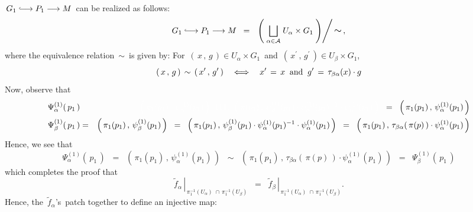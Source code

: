 \,$G_{1} \longhookrightarrow P_{1} \longrightarrow M$\,
can be realized as follows:
\begin{equation*}
G_{1} \longhookrightarrow P_{1} \longrightarrow M
\;\; = \;\;
	\left.\left(\;\underset{\alpha\in\mathcal{A}}{\bigsqcup}\;U_{\alpha} \times G_{1}\;\right)\right\slash\textnormal{\large$\sim$}\,,
\end{equation*}
where the equivalence relation \,$\sim$\, is given by:
For
\,$\left(\,x\,,\,g\,\right) \in U_{\alpha} \times G_{1}$\,
and
\,$\left(\,x^{\prime}\,,\,g^{\prime}\,\right) \in U_{\beta} \times G_{1}$,\,
\begin{equation*}
\left(\,x\,,\,g\,\right) \,\sim\, \left(\,x^{\prime}\,,\,g^{\prime}\,\right)
\quad\Longleftrightarrow\quad
x^{\prime} \,=\, x
\;\;\textnormal{and}\;\;
g^{\prime} \,=\, \tau_{\beta\alpha}(x) \cdot g
\end{equation*}
Now, observe that
\begin{eqnarray*}
\Psi^{(1)}_{\alpha}(\,p_{1}\,)
& {\color{white}=} &
	{\color{white}\left(\,\pi_{1}(p_{1}) \,,\, \psi^{(1)}_{\alpha}(p_{1})\,\right)}
\;\; {\color{white}111.} \;\;
	{\color{white}\left(\,\pi(p_{1}) \,,\, \psi^{(1)}_{\beta}(p_{1}) \cdot \psi^{(1)}_{\alpha}(p_{1})^{-1} \cdot \psi^{(1)}_{\alpha}(p_{1})\,\right)}
\;\; = \;\;
	\left(\,\pi_{1}(p_{1}) \,,\, \psi^{(1)}_{\alpha}(p_{1})\,\right)
\\
\Psi^{(1)}_{\beta}(\,p_{1}\,)
& = &
	\left(\,\pi_{1}(p_{1}) \,,\, \psi^{(1)}_{\beta}(p_{1})\,\right)
\;\; = \;\;
	\left(\,\pi_{1}(p_{1}) \,,\, \psi^{(1)}_{\beta}(p_{1}) \cdot \psi^{(1)}_{\alpha}(p_{1})^{-1} \cdot \psi^{(1)}_{\alpha}(p_{1})\,\right)
\;\; = \;\;
	\left(\,\pi_{1}(p_{1}) \,,\, \tau_{\beta\alpha}(\,\pi(p)\,) \cdot \psi^{(1)}_{\alpha}(p_{1})\,\right)
\end{eqnarray*}
Hence, we see that
\begin{equation*}
\Psi^{(1)}_{\alpha}(\,p_{1}\,)
\;\; = \;\;
	\left(\,\pi_{1}(p_{1}) \,,\, \psi^{(1)}_{\alpha}(p_{1})\,\right)
\;\; \sim \;\;
	\left(\,\pi_{1}(p_{1}) \,,\, \tau_{\beta\alpha}(\,\pi(p)\,) \cdot \psi^{(1)}_{\alpha}(p_{1})\,\right)
\;\; = \;\;
	\Psi^{(1)}_{\beta}(\,p_{1}\,)
\end{equation*}
which completes the proof that
\begin{equation*}
\left.\widetilde{f}_{\alpha}\,\right\vert_{\,\pi_{1}^{-1}(U_{\alpha})\;\cap\,\pi_{1}^{-1}(U_{\beta})}
\;\; = \;\;
\left.\widetilde{f}_{\beta}\,\right\vert_{\,\pi_{1}^{-1}(U_{\alpha})\;\cap\,\pi_{1}^{-1}(U_{\beta})}.
\end{equation*}
Hence, the \,$\widetilde{f}_{\alpha}$'s\, patch together to define an injective map:

